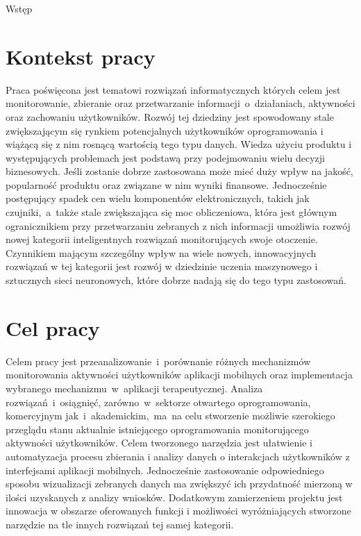 \begin{chapter}{Wstęp}
	\newcommand{\chapterPath}{chapters/Introduction}

	\section{Kontekst pracy}
	Praca poświęcona jest tematowi rozwiązań informatycznych których celem jest monitorowanie, zbieranie oraz przetwarzanie informacji~o~działaniach, aktywności oraz zachowaniu użytkowników. Rozwój tej dziedziny jest spowodowany stale zwiększającym się rynkiem potencjalnych użytkowników oprogramowania i wiążącą się z nim rosnącą wartością tego typu danych. Wiedza użyciu produktu i występujących problemach jest podstawą przy podejmowaniu wielu decyzji biznesowych. Jeśli zostanie dobrze zastosowana może mieć duży wpływ na jakość, popularność produktu oraz związane w nim wyniki finansowe. Jednocześnie postępujący spadek cen wielu komponentów elektronicznych, takich jak czujniki,~a~także stale zwiększająca się moc obliczeniowa, która jest głównym ogranicznikiem  przy przetwarzaniu zebranych z nich informacji umożliwia rozwój nowej kategorii inteligentnych rozwiązań monitorujących swoje otoczenie. Czynnikiem mającym szczególny wpływ na wiele nowych, innowacyjnych rozwiązań w tej kategorii jest rozwój w dziedzinie uczenia maszynowego i sztucznych sieci neuronowych, które dobrze nadają się do tego typu zastosowań.
	
	\section{Cel pracy}
	Celem pracy jest przeanalizowanie~i~porównanie różnych mechanizmów monitorowania aktywności użytkowników aplikacji mobilnych oraz implementacja wybranego mechanizmu~w~aplikacji terapeutycznej. Analiza rozwiązań~i~osiągnięć, zarówno~w~sektorze otwartego oprogramowania, komercyjnym jak~i~akademickim,~ma~na celu stworzenie możliwie szerokiego przeglądu stanu aktualnie istniejącego oprogramowania monitorującego aktywności użytkowników. Celem tworzonego narzędzia jest ułatwienie i automatyzacja procesu zbierania i analizy danych o interakcjach użytkowników z interfejsami aplikacji mobilnych. Jednocześnie zastosowanie odpowiedniego sposobu wizualizacji zebranych danych ma zwiększyć ich przydatność mierzoną w ilości uzyskanych z analizy wniosków. Dodatkowym zamierzeniem projektu jest innowacja w obszarze oferowanych funkcji i możliwości wyróżniających stworzone narzędzie na tle innych rozwiązań tej samej kategorii.
	

\end{chapter}

